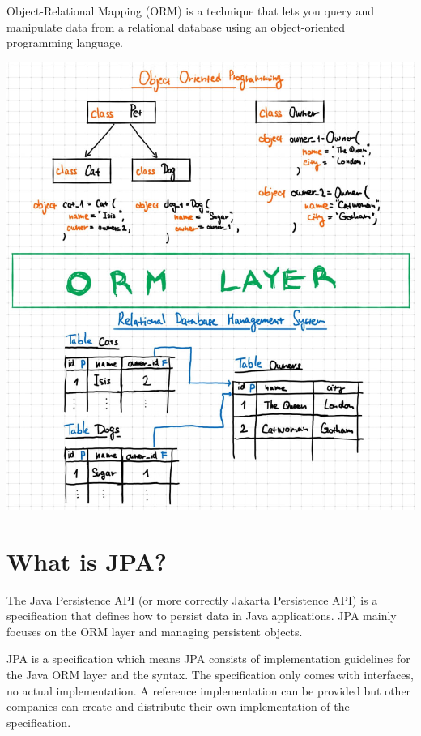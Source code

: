 Object-Relational Mapping (ORM) is a technique that lets you query and manipulate data from a relational database using an object-oriented programming language.

\includegraphics[width=\textwidth]{./images/chapter6/orm}


\section{What is JPA?}

The Java Persistence API (or more correctly Jakarta Persistence API) is a specification that defines how to persist data in Java applications. JPA mainly focuses on the ORM layer and managing persistent objects.

JPA is a specification which means JPA consists of implementation guidelines for the Java ORM layer and the syntax. The specification only comes with interfaces, no actual implementation.  A reference implementation can be provided but other companies can create and distribute their own implementation of the specification.


